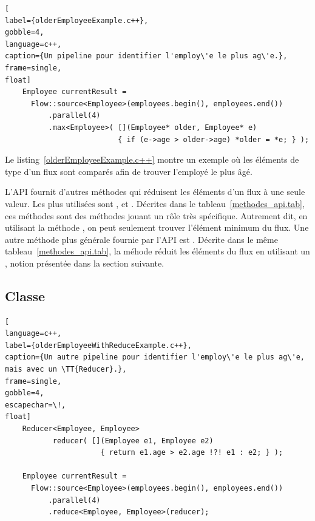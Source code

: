 \begin{lstlisting}[
label={olderEmployeeExample.c++},
gobble=4,
language=c++,
caption={Un pipeline pour identifier l'employ\'e le plus ag\'e.},
frame=single,
float]
    Employee currentResult = 
      Flow::source<Employee>(employees.begin(), employees.end())
          .parallel(4)
          .max<Employee>( [](Employee* older, Employee* e) 
                          { if (e->age > older->age) *older = *e; } );
\end{lstlisting}



Le listing~\ref{olderEmployeeExample.c++} montre un exemple o\`u les \'el\'ements de type  d'un flux sont compar\'es afin de trouver l'employ\'e le plus \^ag\'e.


L'{API} fournit d'autres m\'ethodes qui r\'eduisent les \'el\'ements d'un flux \`a une seule valeur. Les plus utilis\'ees sont ,  et . D\'ecrites dans le tableau~\ref{methodes_api.tab}, ces m\'ethodes sont des m\'ethodes jouant un r\^ole tr\`es sp\'ecifique. Autrement dit, en utilisant la m\'ethode , on peut seulement trouver l'\'el\'ement minimum du flux. Une autre m\'ethode plus g\'en\'erale fournie par l'{API} est . D\'ecrite dans le m\^eme tableau~\ref{methodes_api.tab}, la m\'ehode  r\'eduit les \'el\'ements du flux en utilisant un , notion pr\'esent\'ee dans la section suivante.






\subsection{Classe }

\label{reducer.sect}

\begin{lstlisting}[
language=c++,
label={olderEmployeeWithReduceExample.c++},
caption={Un autre pipeline pour identifier l'employ\'e le plus ag\'e, mais avec un \TT{Reducer}.},
frame=single,
gobble=4,
escapechar=\!,
float]
    Reducer<Employee, Employee> 
           reducer( [](Employee e1, Employee e2) 
                      { return e1.age > e2.age !?! e1 : e2; } );

    Employee currentResult =
      Flow::source<Employee>(employees.begin(), employees.end())
          .parallel(4)
          .reduce<Employee, Employee>(reducer);
\end{lstlisting}



